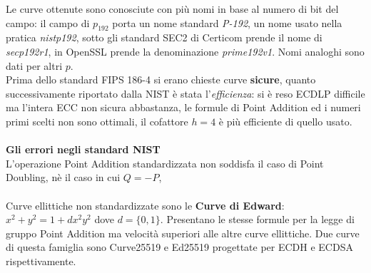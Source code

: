 \documentclass[a4paper,12pt]{tesiinfo}
\begin{document}
Le curve ottenute sono conosciute con pi\`u nomi in base al numero di bit del campo: il campo di $p_192$ porta un nome standard \textit{P-192}, un nome usato nella pratica \textit{nistp192}, sotto gli standard SEC2 di Certicom prende il nome di \textit{secp192r1}, in OpenSSL prende la denominazione \textit{prime192v1}. Nomi analoghi sono dati per altri $p$.
\\
Prima dello standard FIPS 186-4 si erano chieste curve \textbf{sicure}, quanto successivamente riportato dalla NIST \`e stata l'\textit{efficienza}: si \`e reso ECDLP difficile ma l'intera ECC non sicura abbastanza, le formule di Point Addition ed i numeri primi scelti non sono ottimali, il cofattore $h=4$ \`e pi\`u efficiente di quello usato.
\\
\\
\textbf{Gli errori negli standard NIST}
\\
L'operazione Point Addition standardizzata non soddisfa il caso di Point Doubling, n\`e il caso in cui $Q = -P$,  
\\
\\
Curve ellittiche non standardizzate sono le \textbf{Curve di Edward}: $x^2+y^2=1+dx^2y^2 $ dove $d= \{0, 1\}$. Presentano le stesse formule per la legge di gruppo Point Addition ma velocit\`a superiori alle altre curve ellittiche. Due curve di questa famiglia sono Curve25519 e Ed25519 progettate per ECDH e ECDSA rispettivamente.
%
%
%
%
%
%
%
%
%
%
%





















%
%
%
%
%
%
%
%
%
%
%
%
%
%
%
%
%
%
%
%
%
%
%
%
%
%
%
%
%
%
\end{document}
